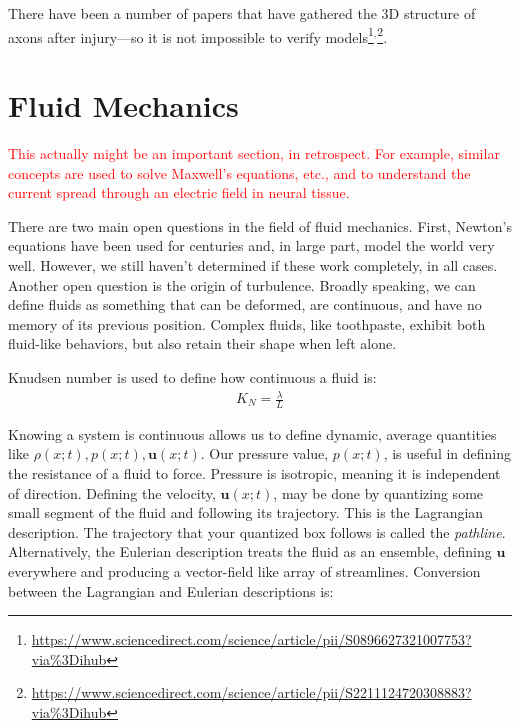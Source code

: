 There have been a number of papers that have gathered the 3D structure of axons after injury---so it is not impossible to verify models\footnote{\url{https://www.sciencedirect.com/science/article/pii/S0896627321007753?via\%3Dihub}}$^,$\footnote{\url{https://www.sciencedirect.com/science/article/pii/S2211124720308883?via\%3Dihub}}. 


\section{Fluid Mechanics}

\textcolor{red}{This actually might be an important section, in retrospect. For example, similar concepts are used to solve Maxwell's equations, etc., and to understand the current spread through an electric field in neural tissue.}\newline

There are two main open questions in the field of fluid mechanics. First, Newton's equations have been used for centuries and, in large part, model the world very well. However, we still haven't determined if these work completely, in all cases. Another open question is the origin of turbulence. Broadly speaking, we can define fluids as something that can be deformed, are continuous, and have no memory of its previous position. Complex fluids, like toothpaste, exhibit both fluid-like behaviors, but also retain their shape when left alone. \newline

Knudsen number is used to define how continuous a fluid is: 
\begin{equation} \label{knum}
\begin{split}
K_N = \frac{\lambda}{L}
\end{split}
\end{equation}

Knowing a system is continuous allows us to define dynamic, average quantities like $\rho(x;t), p(x;t), \mathbf{u}(x;t)$. Our pressure value, $p(x;t)$, is useful in defining the resistance of a fluid to force. Pressure is isotropic, meaning it is independent of direction. Defining the velocity, $\mathbf{u}(x;t)$, may be done by quantizing some small segment of the fluid and following its trajectory. This is the Lagrangian description. The trajectory that your quantized box follows is called the \textit{pathline}. Alternatively, the Eulerian description treats the fluid as an ensemble, defining $\mathbf{u}$ everywhere and producing a vector-field like array of streamlines. Conversion between the Lagrangian and Eulerian descriptions is:\newline

